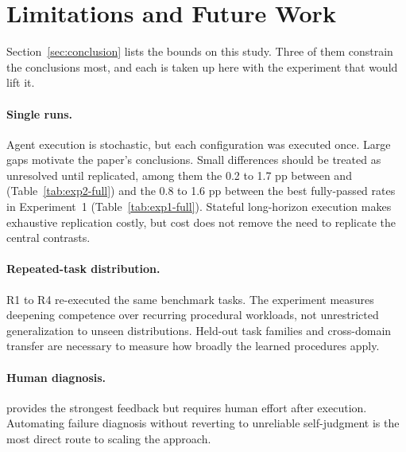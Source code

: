 \section{Limitations and Future Work}
\label{app:limitations}

Section~\ref{sec:conclusion} lists the bounds on this study. Three of
them constrain the conclusions most, and each is taken up here with the
experiment that would lift it.

\paragraph{Single runs.}
Agent execution is stochastic, but each configuration was executed once. Large
gaps motivate the paper's conclusions. Small differences should be
treated as unresolved until replicated, among them the 0.2 to 1.7 pp between
 and  (Table~\ref{tab:exp2-full}) and the 0.8 to 1.6 pp between the best
fully-passed rates in Experiment~1 (Table~\ref{tab:exp1-full}). Stateful long-horizon execution makes exhaustive replication
costly, but cost does not remove the need to replicate the central contrasts.

\paragraph{Repeated-task distribution.}
R1 to R4 re-executed the same benchmark tasks. The experiment measures
deepening competence over recurring procedural workloads, not unrestricted
generalization to unseen distributions. Held-out task families and cross-domain
transfer are necessary to measure how broadly the learned procedures apply.

\paragraph{Human diagnosis.}
 provides the strongest feedback but requires human
effort after execution. Automating failure diagnosis without reverting to
unreliable self-judgment is the most direct route to scaling the approach.
